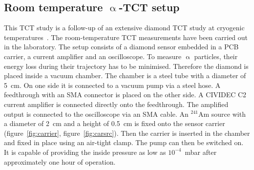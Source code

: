 \subsection{Room temperature $\upalpha$-TCT setup}
This TCT study is a follow-up of an extensive diamond TCT study at cryogenic temperatures~\cite{Jansen:1956431}. The room-temperature TCT measurements have been carried out in the laboratory. The setup consists of a diamond sensor embedded in a PCB carrier, a current amplifier and an oscilloscope. To measure $\upalpha$ particles, their energy loss during their trajectory has to be minimised. Therefore the diamond is placed inside a vacuum chamber. The chamber is a steel tube with a diameter of 5~cm. On one side it is connected to a vacuum pump via a steel hose. A feedthrough with an SMA connector is placed on the other side. A CIVIDEC C2 current amplifier is connected directly onto the feedthrough. The amplified output is connected to the oscilloscope via an SMA cable. An $^{241}$Am source with a diameter of 2~cm and a height of 0.5~cm is fixed onto the sensor carrier (figure~\ref{fig:carrier}, figure~\ref{fig:carsrc}). Then the carrier is inserted in the chamber and fixed in place using an air-tight clamp. The pump can then be switched on. It is capable of providing the inside pressure as low as $10^{-4}$~mbar after approximately one hour of operation.

